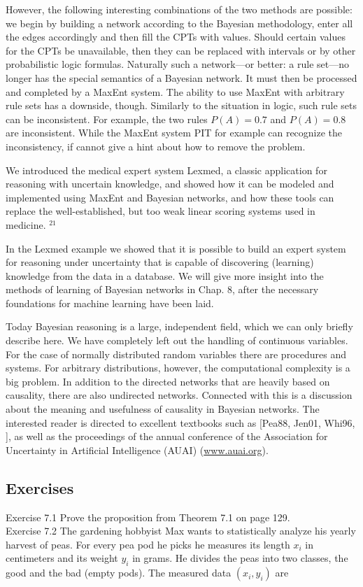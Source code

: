 \documentclass[10pt]{book}
\begin{document}
However, the following interesting combinations of the two methods are possible: we begin by building a network according to the Bayesian methodology, enter all the edges accordingly and then fill the CPTs with values. Should certain values for the CPTs be unavailable, then they can be replaced with intervals or by other probabilistic logic formulas. Naturally such a network—or better: a rule set—no longer has the special semantics of a Bayesian network. It must then be processed and completed by a MaxEnt system.
The ability to use MaxEnt with arbitrary rule sets has a downside, though. Similarly to the situation in logic, such rule sets can be inconsistent. For example, the two rules $P(A)=0.7$ and $P(A)=0.8$ are inconsistent. While the MaxEnt system PIT for example can recognize the inconsistency, if cannot give a hint about how to remove the problem.

We introduced the medical expert system Lexmed, a classic application for reasoning with uncertain knowledge, and showed how it can be modeled and implemented using MaxEnt and Bayesian networks, and how these tools can replace the well-established, but too weak linear scoring systems used in medicine. ${ }^{21}$

In the Lexmed example we showed that it is possible to build an expert system for reasoning under uncertainty that is capable of discovering (learning) knowledge from the data in a database. We will give more insight into the methods of learning of Bayesian networks in Chap. 8, after the necessary foundations for machine learning have been laid.

Today Bayesian reasoning is a large, independent field, which we can only briefly describe here. We have completely left out the handling of continuous variables. For the case of normally distributed random variables there are procedures and systems. For arbitrary distributions, however, the computational complexity is a big problem. In addition to the directed networks that are heavily based on causality, there are also undirected networks. Connected with this is a discussion about the meaning and usefulness of causality in Bayesian networks. The interested reader is directed to excellent textbooks such as [Pea88, Jen01, Whi96, \cite{dhs01}], as well as the proceedings of the annual conference of the Association for Uncertainty in Artificial Intelligence (AUAI) (\href{http://www.auai.org}{www.auai.org}).

\subsection{Exercises}
Exercise 7.1 Prove the proposition from Theorem 7.1 on page 129.\\
Exercise 7.2 The gardening hobbyist Max wants to statistically analyze his yearly harvest of peas. For every pea pod he picks he measures its length $x_{i}$ in centimeters and its weight $y_{i}$ in grams. He divides the peas into two classes, the good and the bad (empty pods). The measured data $(x_{i}, y_{i})$ are
\end{document}
